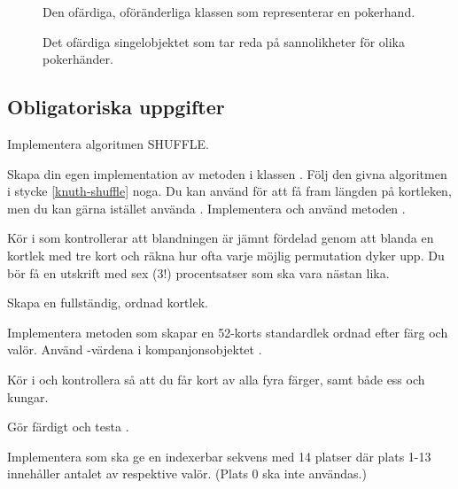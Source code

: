 \begin{figure}
\caption{Den ofärdiga, oföränderliga klassen  som representerar en pokerhand.}
\label{shuffle:fig-hand}
\end{figure}

\begin{figure}
\caption{Det ofärdiga singelobjektet  som tar reda på sannolikheter för olika pokerhänder.}
\label{shuffle:fig-pokerprob}
\end{figure}


\subsection{Obligatoriska uppgifter}\label{subsection:lab:shuffle:tasks}


\Task Implementera algoritmen SHUFFLE.

\Subtask Skapa din egen implementation av metoden  i klassen . Följ den givna algoritmen i stycke \ref{knuth-shuffle} noga. Du kan använd  för att få fram längden på kortleken, men du kan gärna istället använda . Implementera och använd metoden  .

\Subtask Kör  i  som kontrollerar att blandningen är jämnt fördelad genom att blanda en kortlek med tre kort och räkna hur ofta varje möjlig permutation dyker upp. Du bör få en utskrift med sex ($3!$) procentsatser som ska vara nästan lika.


\Task Skapa en fullständig, ordnad kortlek.

\Subtask Implementera metoden  som skapar en 52-korts standardlek ordnad efter färg och valör. Använd -värdena i kompanjonsobjektet .

\Subtask Kör  i  och kontrollera så att du får kort av alla fyra färger, samt både ess och kungar.


\Task Gör färdigt och testa .

\Subtask Implementera  som ska ge en indexerbar sekvens med 14 platser där plats 1-13 innehåller antalet av respektive valör. (Plats 0 ska inte användas.)


